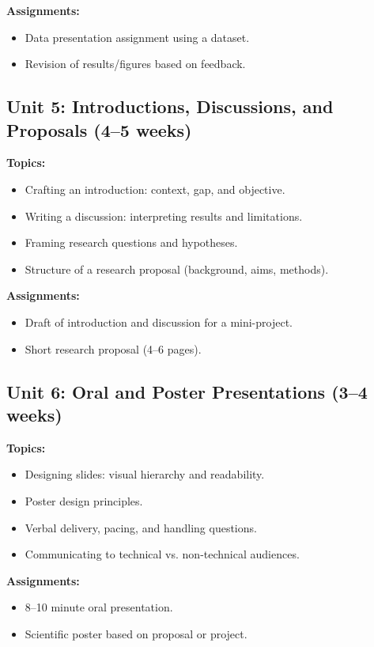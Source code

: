 \documentclass[12pt,oneside]{book}
\begin{document}
\textbf{Assignments:}
\begin{itemize}
    \item Data presentation assignment using a dataset.
    \item Revision of results/figures based on feedback.
\end{itemize}

\subsection{Unit 5: Introductions, Discussions, and Proposals (4--5 weeks)}

\textbf{Topics:}
\begin{itemize}
    \item Crafting an introduction: context, gap, and objective.
    \item Writing a discussion: interpreting results and limitations.
    \item Framing research questions and hypotheses.
    \item Structure of a research proposal (background, aims, methods).
\end{itemize}

\textbf{Assignments:}
\begin{itemize}
    \item Draft of introduction and discussion for a mini-project.
    \item Short research proposal (4–6 pages).
\end{itemize}

\subsection{Unit 6: Oral and Poster Presentations (3--4 weeks)}

\textbf{Topics:}
\begin{itemize}
    \item Designing slides: visual hierarchy and readability.
    \item Poster design principles.
    \item Verbal delivery, pacing, and handling questions.
    \item Communicating to technical vs. non-technical audiences.
\end{itemize}

\textbf{Assignments:}
\begin{itemize}
    \item 8–10 minute oral presentation.
    \item Scientific poster based on proposal or project.
\end{itemize}
\end{document}
